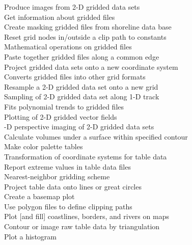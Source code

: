 \begin{tabbing}
	\>	Produce images from 2-D gridded data sets \\ 
	\>	Get information about gridded files \\ 
	\>	Create masking gridded files from shoreline data base \\ 
	\>	Reset grid nodes in/outside a clip path to constants \\ 
	\>	Mathematical operations on gridded files \\ 
	\>	Paste together gridded files along a common edge \\ 
	\>	Project gridded data sets onto a new coordinate system \\ 
	\>	Converts gridded files into other grid formats \\ 
	\>	Resample a 2-D gridded data set onto a new grid \\ 
	\>	Sampling of 2-D gridded data set along 1-D track \\ 
	\>	Fits polynomial trends to gridded files \\ 
	\>	Plotting of 2-D gridded vector fields \\ 
	-D perspective imaging of 2-D gridded data sets \\ 
	\>	Calculate volumes under a surface within specified contour \\ 
	\>	Make color palette tables \\ 
	\>	Transformation of coordinate systems for table data \\ 
	\>	Report extreme values in table data files \\ 
	\>	Nearest-neighbor gridding scheme \\ 
	\>	Project table data onto lines or great circles \\ 
	\>	Create a basemap plot \\ 
	\>	Use polygon files to define clipping paths \\ 
	\>	Plot [and fill] coastlines, borders, and rivers on maps \\ 
	\>	Contour or image raw table data by triangulation \\ 
	\>	Plot a histogram \\ 

\end{tabbing}
